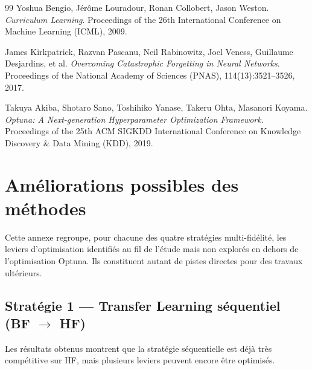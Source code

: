 \documentclass[11pt,a4paper,openany]{book}
\begin{document}
\begin{thebibliography}{99}
Yoshua Bengio, Jérôme Louradour, Ronan Collobert, Jason Weston.
\textit{Curriculum Learning}.
Proceedings of the 26th International Conference on Machine Learning (ICML), 2009.

James Kirkpatrick, Razvan Pascanu, Neil Rabinowitz, Joel Veness, Guillaume Desjardins, et al.
\textit{Overcoming Catastrophic Forgetting in Neural Networks}.
Proceedings of the National Academy of Sciences (PNAS), 114(13):3521--3526, 2017.

Takuya Akiba, Shotaro Sano, Toshihiko Yanase, Takeru Ohta, Masanori Koyama.
\textit{Optuna: A Next-generation Hyperparameter Optimization Framework}.
Proceedings of the 25th ACM SIGKDD International Conference on Knowledge Discovery \& Data Mining (KDD), 2019.

\end{thebibliography}

\appendix
\renewcommand{\thechapter}{\arabic{chapter}}
\setcounter{chapter}{0}

\chapter{Améliorations possibles des méthodes}

Cette annexe regroupe, pour chacune des quatre stratégies multi-fidélité, les leviers d'optimisation identifiés au fil de l'étude mais non explorés en dehors de l'optimisation Optuna. Ils constituent autant de pistes directes pour des travaux ultérieurs.

\section{Stratégie 1 — Transfer Learning séquentiel (BF $\rightarrow$ HF)}

Les résultats obtenus montrent que la stratégie séquentielle est déjà très compétitive sur HF, mais plusieurs leviers peuvent encore être optimisés.
\end{document}
